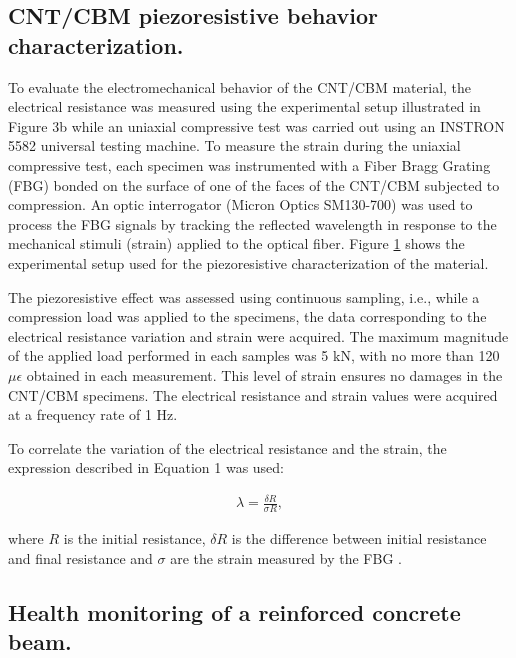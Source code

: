 \documentclass[twocolumn]{bmcart}%
\begin{document}
\subsection{CNT/CBM piezoresistive behavior characterization.}

To evaluate the electromechanical behavior of the CNT/CBM material, the electrical resistance was measured using the experimental setup illustrated in Figure 3b while an uniaxial compressive test was carried out using an INSTRON 5582 universal testing machine. To measure the strain during the uniaxial compressive test, each specimen was instrumented with a Fiber Bragg Grating (FBG) bonded on the surface of one of the faces of the CNT/CBM subjected to compression. An optic interrogator (Micron Optics SM130-700) was used to process the FBG signals by tracking the reflected wavelength in response to the mechanical stimuli (strain) applied to the optical fiber. Figure \ref{fig4} shows the experimental setup used for the piezoresistive characterization of the material. 


The piezoresistive effect was assessed using continuous sampling, i.e., while a compression load was applied to the specimens, the data corresponding to the electrical resistance variation and strain were acquired. The maximum magnitude of the applied load performed in each samples was 5 kN, with no more than 120 $\mu\epsilon$ obtained in each measurement. This level of strain ensures no damages in the CNT/CBM specimens. The electrical resistance and strain values were acquired at a frequency rate of 1 Hz.

\begin{figure}[h!]
  \caption{
      }
    \label{fig4}
      \end{figure}

To correlate the variation of the electrical resistance and the strain, the expression described in Equation 1 was used:

\begin{eqnarray}\label{eqexpmuts}
\lambda = \frac{\delta R}{\sigma R},
\label{eq1}
\end{eqnarray}

    
where $R$ is the initial resistance, $\delta R$ is the difference between initial resistance and final resistance and $\sigma$ are the strain measured by the FBG \cite{Pisello2017, Jang2017}.

\subsection{Health monitoring of a reinforced concrete beam.}
\end{document}

